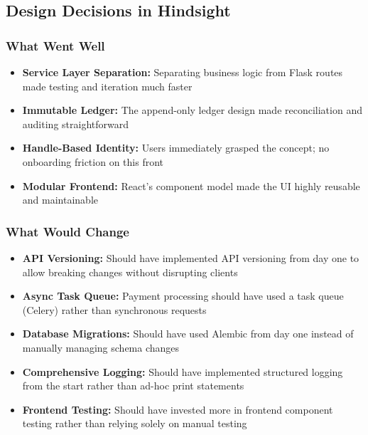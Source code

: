 \documentclass[12pt, a4paper, twoside, openright]{report}
\begin{document}
\subsection{Design Decisions in Hindsight}

\subsubsection{What Went Well}

\begin{itemize}
    \item \textbf{Service Layer Separation:} Separating business logic from Flask routes made testing and iteration much faster
    \item \textbf{Immutable Ledger:} The append-only ledger design made reconciliation and auditing straightforward
    \item \textbf{Handle-Based Identity:} Users immediately grasped the concept; no onboarding friction on this front
    \item \textbf{Modular Frontend:} React's component model made the UI highly reusable and maintainable
\end{itemize}

\subsubsection{What Would Change}

\begin{itemize}
    \item \textbf{API Versioning:} Should have implemented API versioning from day one to allow breaking changes without disrupting clients
    \item \textbf{Async Task Queue:} Payment processing should have used a task queue (Celery) rather than synchronous requests
    \item \textbf{Database Migrations:} Should have used Alembic from day one instead of manually managing schema changes
    \item \textbf{Comprehensive Logging:} Should have implemented structured logging from the start rather than ad-hoc print statements
    \item \textbf{Frontend Testing:} Should have invested more in frontend component testing rather than relying solely on manual testing
\end{itemize}

\end{document}
